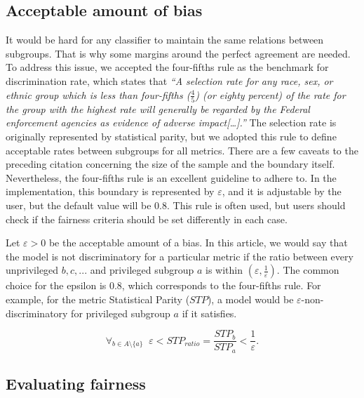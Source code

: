\hypertarget{bias}{%
\subsection{Acceptable amount of bias}\label{bias}}

It would be hard for any classifier to maintain the same relations
between subgroups. That is why some margins around the perfect agreement
are needed. To address this issue, we accepted the four-fifths rule
\citep{adverseimpact} as the benchmark for discrimination rate, which
states that \emph{``A selection rate for any race, sex, or ethnic group
which is less than four-fifths (\emph{\(\frac{4}{5}\)}) (or eighty
percent) of the rate for the group with the highest rate will generally
be regarded by the Federal enforcement agencies as evidence of adverse
impact{[}\ldots{]}.''} The selection rate is originally represented by
statistical parity, but we adopted this rule to define acceptable rates
between subgroups for all metrics. There are a few caveats to the
preceding citation concerning the size of the sample and the boundary
itself. Nevertheless, the four-fifths rule is an excellent guideline to
adhere to. In the implementation, this boundary is represented by
\(\varepsilon\), and it is adjustable by the user, but the default value
will be 0.8. This rule is often used, but users should check if the
fairness criteria should be set differently in each case.

Let \(\varepsilon > 0\) be the acceptable amount of a bias. In this
article, we would say that the model is not discriminatory for a
particular metric if the ratio between every unprivileged \(b, c, ...\)
and privileged subgroup \(a\) is within
\((\varepsilon, \frac{1}{\varepsilon})\). The common choice for the
epsilon is 0.8, which corresponds to the four-fifths rule. For example,
for the metric Statistical Parity (\(STP\)), a model would be
\(\varepsilon\)-non-discriminatory for privileged subgroup \(a\) if it
satisfies.

\begin{equation} 
\forall_{b \in A \setminus \{a\}} \;\;
   \varepsilon < STP_{ratio} = \frac{STP_b}{STP_a} < \frac{1}{\varepsilon}.
  \label{eq:ratio}
\end{equation}

\hypertarget{evaluating-fairness}{%
\subsection{Evaluating fairness}\label{evaluating-fairness}}

